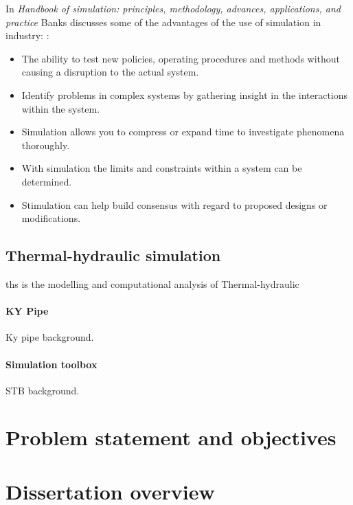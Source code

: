  In \textit{ Handbook of simulation: principles, methodology, advances, applications, and practice} Banks discusses some of the advantages of the use of simulation in industry: \cite{banks1998handbook}:
\begin{itemize}
	\item The ability to test new policies, operating procedures and methods without causing a disruption to the actual system.
	\item Identify problems in complex systems by gathering insight in the interactions within the system.
	\item Simulation allows you to compress or expand time to investigate phenomena thoroughly.
	\item With simulation the limits and constraints within a system can be determined.
	\item Stimulation can help build consensus with regard to proposed designs or modifications.
\end{itemize}

\subsection{Thermal-hydraulic simulation}
\gls{ths} is the modelling and  computational analysis of Thermal-hydraulic
\paragraph{KY Pipe}
Ky pipe background. \cite{Wood1993KYPipe}
\paragraph{Simulation toolbox}
STB background.
\section{Problem statement and objectives}
\section{Dissertation overview}
